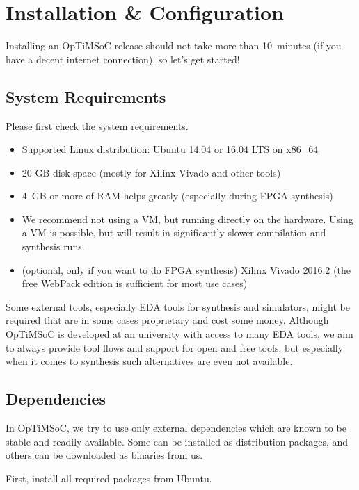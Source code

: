 \chapter{Installation \& Configuration}
\label{chap:installation}

Installing an OpTiMSoC release should not take more than 10~minutes (if you have a decent internet connection), so let's get started!

\section{System Requirements}
Please first check the system requirements.

\begin{itemize}
 \item Supported Linux distribution: Ubuntu 14.04 or 16.04 LTS on x86\_64
 \item 20 GB disk space (mostly for Xilinx Vivado and other tools)
 \item 4~GB or more of RAM helps greatly (especially during FPGA synthesis)
 \item We recommend not using a VM, but running directly on the hardware.
   Using a VM is possible, but will result in significantly slower compilation and synthesis runs.
 \item (optional, only if you want to do FPGA synthesis) Xilinx Vivado 2016.2 (the free WebPack edition is sufficient for most use cases)
\end{itemize}

\begin{docnote}
Some external tools, especially EDA tools for synthesis and simulators, might be required that are in some cases proprietary and cost some money. Although OpTiMSoC is developed at an university with access to many EDA tools, we aim to always provide tool flows and support for open and free tools, but especially when it comes to synthesis such alternatives are even not available.
\end{docnote}

\section{Dependencies}
In OpTiMSoC, we try to use only external dependencies which are known to be stable and readily available.
Some can be installed as distribution packages, and others can be downloaded as binaries from us.

First, install all required packages from Ubuntu.

